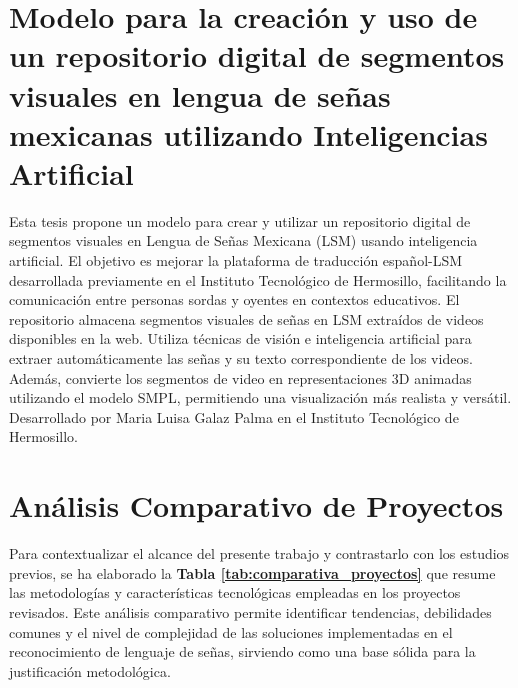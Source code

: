 \section{Modelo para la creación y uso de un repositorio digital de segmentos visuales en lengua de señas mexicanas utilizando Inteligencias Artificial \cite{ref33}}

Esta tesis propone un modelo para crear y utilizar un repositorio digital de segmentos visuales en Lengua de Señas Mexicana (LSM) usando inteligencia artificial. El objetivo es mejorar la plataforma de traducción español-LSM desarrollada previamente en el Instituto Tecnológico de Hermosillo, facilitando la comunicación entre personas sordas y oyentes en contextos educativos.  El repositorio almacena segmentos visuales de señas en LSM extraídos de videos disponibles en la web.  Utiliza técnicas de visión e inteligencia artificial para extraer automáticamente las señas y su  texto correspondiente de los videos.  Además, convierte los segmentos de video en representaciones 3D animadas utilizando el modelo SMPL, permitiendo una visualización más realista y versátil.  Desarrollado por Maria Luisa Galaz Palma en el Instituto Tecnológico de Hermosillo.

\section{Análisis Comparativo de Proyectos}

Para contextualizar el alcance del presente trabajo y contrastarlo con los estudios previos, se ha elaborado la \textbf{Tabla \ref{tab:comparativa_proyectos}} que resume las metodologías y características tecnológicas empleadas en los proyectos revisados. Este análisis comparativo permite identificar tendencias, debilidades comunes y el nivel de complejidad de las soluciones implementadas en el reconocimiento de lenguaje de señas, sirviendo como una base sólida para la justificación metodológica.

